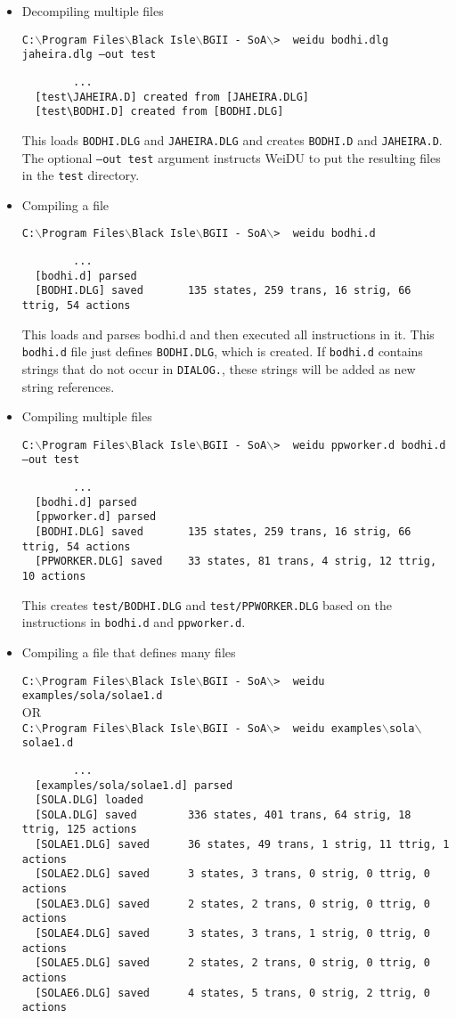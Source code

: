 \documentclass{article}
\def\ttref#1{\ahrefloc{#1}{\tt #1}}
\def\t#1{{\tt #1}}
\def\CMD#1{{\tt {C:$\backslash$Program Files$\backslash$Black Isle$\backslash$BGII - SoA$\backslash$>} \color{red} \t{#1} }}
\begin{document}
\begin{itemize}
\item  Decompiling multiple \ttref{DLG} files

  \CMD{ weidu bodhi.dlg jaheira.dlg --out test}
\begin{verbatim}
        ...
  [test\JAHEIRA.D] created from [JAHEIRA.DLG]
  [test\BODHI.D] created from [BODHI.DLG]
\end{verbatim}

  This loads \t{BODHI.DLG} and \t{JAHEIRA.DLG} and creates \t{BODHI.D} and
  \t{JAHEIRA.D}. The optional
  \t{--out test} argument instructs WeiDU to put the resulting \ttref{D}
  files in the \t{test} directory.

\item  Compiling a \ttref{D} file

  \CMD{ weidu bodhi.d}
\begin{verbatim}
        ...
  [bodhi.d] parsed
  [BODHI.DLG] saved       135 states, 259 trans, 16 strig, 66 ttrig, 54 actions
\end{verbatim}

  This loads and parses bodhi.d and then executed all instructions in it.
  This \t{bodhi.d} file just defines \t{BODHI.DLG}, which is created. If
  \t{bodhi.d} contains strings that do not occur in \t{DIALOG.}\ttref{TLK},
  these strings will be added as new string references.

\item  Compiling multiple \ttref{D} files

  \CMD{ weidu ppworker.d bodhi.d --out test}
\begin{verbatim}
        ...
  [bodhi.d] parsed
  [ppworker.d] parsed
  [BODHI.DLG] saved       135 states, 259 trans, 16 strig, 66 ttrig, 54 actions
  [PPWORKER.DLG] saved    33 states, 81 trans, 4 strig, 12 ttrig, 10 actions
\end{verbatim}

  This creates \t{test/BODHI.DLG} and \t{test/PPWORKER.DLG} based on the
  instructions in \t{bodhi.d} and \t{ppworker.d}.

\item  Compiling a \ttref{D} file that defines many \ttref{DLG} files

  \CMD{ weidu examples/sola/solae1.d}
    \\ OR \\
  \CMD{ weidu examples$\backslash$sola$\backslash$solae1.d}
\begin{verbatim}
        ...
  [examples/sola/solae1.d] parsed
  [SOLA.DLG] loaded
  [SOLA.DLG] saved        336 states, 401 trans, 64 strig, 18 ttrig, 125 actions
  [SOLAE1.DLG] saved      36 states, 49 trans, 1 strig, 11 ttrig, 1 actions
  [SOLAE2.DLG] saved      3 states, 3 trans, 0 strig, 0 ttrig, 0 actions
  [SOLAE3.DLG] saved      2 states, 2 trans, 0 strig, 0 ttrig, 0 actions
  [SOLAE4.DLG] saved      3 states, 3 trans, 1 strig, 0 ttrig, 0 actions
  [SOLAE5.DLG] saved      2 states, 2 trans, 0 strig, 0 ttrig, 0 actions
  [SOLAE6.DLG] saved      4 states, 5 trans, 0 strig, 2 ttrig, 0 actions
\end{verbatim}


\end{itemize}
\end{document}
